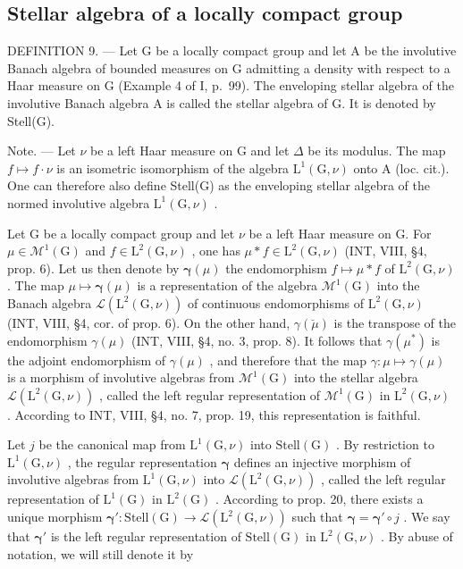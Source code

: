 \subsection{Stellar algebra of a locally compact group}

DEFINITION 9. --- Let G be a locally compact group and let A be the involutive Banach algebra of bounded measures on G admitting a density with respect to a Haar measure on G (Example 4 of I, p.~99). The enveloping stellar algebra of the involutive Banach algebra A is called the stellar algebra of G. It is denoted by Stell(G).

Note. --- Let \(\nu\) be a left Haar measure on G and let \(\Delta\) be its modulus. The map \(f \mapsto f \cdot \nu\) is an isometric isomorphism of the algebra \(\mathrm{L}^{1}(\mathrm{G}, \nu)\) onto A (loc. cit.). One can therefore also define Stell(G) as the enveloping stellar algebra of the normed involutive algebra \(\mathrm{L}^{1}(\mathrm{G}, \nu)\) .

Let G be a locally compact group and let \(\nu\) be a left Haar measure on G. For \(\mu \in \mathcal{M}^1 (\mathrm{G})\) and \(f\in \mathrm{L}^2 (\mathrm{G},\nu)\) , one has \(\mu *f\in \mathrm{L}^2 (\mathrm{G},\nu)\) (INT, VIII, §4, prop. 6). Let us then denote by \(\pmb{\gamma}(\mu)\) the endomorphism \(f\mapsto \mu *f\) of \(\mathrm{L}^2 (\mathrm{G},\nu)\) . The map \(\mu \mapsto \pmb{\gamma}(\mu)\) is a representation of the algebra \(\mathcal{M}^{1}(\mathrm{G})\) into the Banach algebra \(\mathcal{L}(\mathrm{L}^{2}(\mathrm{G},\nu))\) of continuous endomorphisms of \(\mathrm{L}^2 (\mathrm{G},\nu)\) (INT, VIII, §4, cor. of prop. 6). On the other hand, \(\gamma (\breve{\mu})\) is the transpose of the endomorphism \(\gamma (\mu)\) (INT, VIII, §4, no. 3, prop. 8). It follows that \(\gamma (\mu^{*})\) is the adjoint endomorphism of \(\gamma (\mu)\) , and therefore that the map \(\gamma \colon \mu \mapsto \gamma (\mu)\) is a morphism of involutive algebras from \(\mathcal{M}^{1}(\mathrm{G})\) into the stellar algebra \(\mathcal{L}(\mathrm{L}^{2}(\mathrm{G},\nu))\) , called the left regular representation of \(\mathcal{M}^{1}(\mathrm{G})\) in \(\mathrm{L}^2 (\mathrm{G},\nu)\) . According to INT, VIII, §4, no. 7, prop. 19, this representation is faithful.

Let \(j\) be the canonical map from \(\mathrm{L}^{1}(\mathrm{G},\nu)\) into \(\mathrm{Stell}(\mathrm{G})\) . By restriction to \(\mathrm{L}^{1}(\mathrm{G},\nu)\) , the regular representation \(\pmb{\gamma}\) defines an injective morphism of involutive algebras from \(\mathrm{L}^{1}(\mathrm{G},\nu)\) into \(\mathcal{L}(\mathrm{L}^{2}(\mathrm{G},\nu))\) , called the left regular representation of \(\mathrm{L}^{1}(\mathrm{G})\) in \(\mathrm{L}^{2}(\mathrm{G})\) . According to prop. 20, there exists a unique morphism \(\pmb{\gamma}'\colon \mathrm{Stell}(\mathrm{G})\to \mathcal{L}(\mathrm{L}^{2}(\mathrm{G},\nu))\) such that \(\pmb{\gamma} = \pmb{\gamma}'\circ j\) . We say that \(\pmb{\gamma}'\) is the left regular representation of \(\mathrm{Stell}(\mathrm{G})\) in \(\mathrm{L}^{2}(\mathrm{G},\nu)\) . By abuse of notation, we will still denote it by

